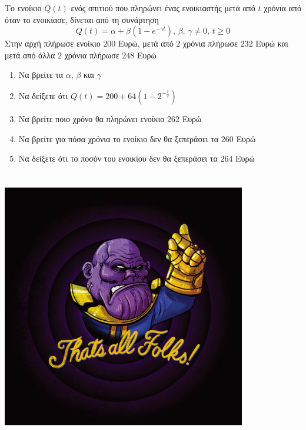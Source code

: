 \documentclass{../presentation}
\begin{document}
\begin{askisi}
  Το ενοίκιο $Q(t)$ ενός σπιτιού που πληρώνει ένας ενοικιαστής μετά από $t$ χρόνια από όταν το ενοικίασε, δίνεται από τη συνάρτηση
  $$Q(t)=α+β(1-e^{-γt}) \text{, } β \text{, } γ\ne 0\text{, } t\ge 0$$
  Στην αρχή πλήρωσε ενοίκιο $200$ Ευρώ, μετά από $2$ χρόνια πλήρωσε $232$ Ευρώ και μετά από άλλα $2$ χρόνια πλήρωσε $248$ Ευρώ
  \begin{enumerate}
    \item<1-> Να βρείτε τα $α$, $β$ και $γ$
    \item<2-> Να δείξετε ότι $Q(t)=200+64\left( 1-2^{-\frac{1}{2}} \right) $
    \item<3-> Να βρείτε ποιο χρόνο θα πληρώνει ενοίκιο $262$ Ευρώ
    \item<4-> Να βρείτε για πόσα χρόνια το ενοίκιο δεν θα ξεπεράσει τα $260$ Ευρώ
    \item<5-> Να δείξετε ότι το ποσόν του ενοικίου δεν θα ξεπεράσει τα $264$ Ευρώ
  \end{enumerate}


\end{askisi}

\appendix

\section{}
\begin{frame}
  \centering
  \includegraphics[width=0.8\textwidth]{"./images/thatsall.png"}

\end{frame}
\end{document}
